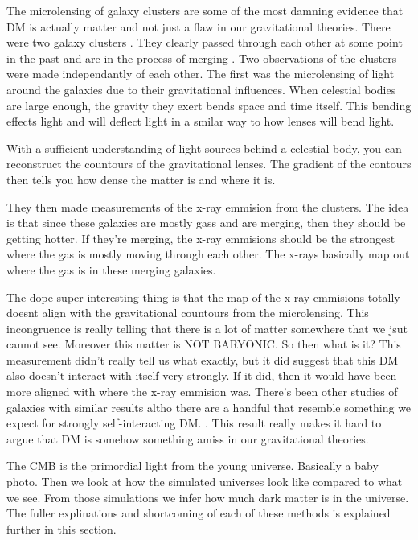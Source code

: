 The microlensing of galaxy clusters are some of the most damning evidence that DM is actually matter and not just a flaw in our gravitational theories.
There were two galaxy clusters \fu.
They clearly passed through each other at some point in the past and are in the process of merging \ns.
Two observations of the clusters were made independantly of each other.
The first was the microlensing of light around the galaxies due to their gravitational influences.
When celestial bodies are large enough, the gravity they exert bends space and time itself.
This bending effects light and will deflect light in a smilar way to how lenses will bend light.


With a sufficient understanding of light sources behind a celestial body, you can reconstruct the countours of the gravitational lenses.
The gradient of the contours then tells you how dense the matter is and where it is.

They then made measurements of the x-ray emmision from the clusters.
The idea is that since these galaxies are mostly gass and are merging, then they should be getting hotter.
If they're merging, the x-ray emmisions should be the strongest where the gas is mostly moving through each other.
The x-rays basically map out where the gas is in these merging galaxies.


The dope super interesting thing is that the map of the x-ray emmisions totally doesnt align with the gravitational countours from the microlensing.
This incongruence is really telling that there is a lot of matter somewhere that we jsut cannot see.
Moreover this matter is NOT BARYONIC.
So then what is it?
This measurement didn't really tell us what exactly, but it did suggest that this DM also doesn't interact with itself very strongly.
If it did, then it would have been more aligned with where the x-ray emmision was.
There's been other studies of galaxies with similar results altho there are a handful that resemble something we expect for strongly self-interacting DM. \ns.
This result really makes it hard to argue that DM is somehow something amiss in our gravitational theories.

The CMB is the primordial light from the young universe.
Basically a baby photo.
Then we look at how the simulated universes look like compared to what we see.
From those simulations we infer how much dark matter is in the universe.
The fuller explinations and shortcoming of each of these methods is explained further in this section.


